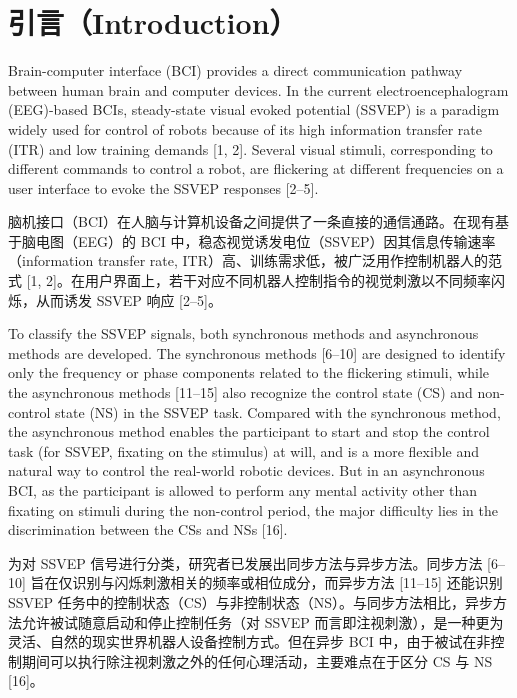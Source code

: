\documentclass[11pt]{ctexart}
\newenvironment{en}{\begin{enbox}\color{black!85}}{\end{enbox}}
\newenvironment{zh}{\begin{zhbox}}{\end{zhbox}}
\begin{document}
\section{引言（Introduction）}

\begin{en}
Brain-computer interface (BCI) provides a direct communication pathway between human brain and computer devices. In the current electroencephalogram (EEG)-based BCIs, steady-state visual evoked potential (SSVEP) is a paradigm widely used for control of robots because of its high information transfer rate (ITR) and low training demands [1, 2]. Several visual stimuli, corresponding to different commands to control a robot, are flickering at different frequencies on a user interface to evoke the SSVEP responses [2--5].
\end{en}
\begin{zh}
脑机接口（BCI）在人脑与计算机设备之间提供了一条直接的通信通路。在现有基于脑电图（EEG）的 BCI 中，稳态视觉诱发电位（SSVEP）因其信息传输速率（information transfer rate, ITR）高、训练需求低，被广泛用作控制机器人的范式 [1, 2]。在用户界面上，若干对应不同机器人控制指令的视觉刺激以不同频率闪烁，从而诱发 SSVEP 响应 [2--5]。
\end{zh}

\begin{en}
To classify the SSVEP signals, both synchronous methods and asynchronous methods are developed. The synchronous methods [6--10] are designed to identify only the frequency or phase components related to the flickering stimuli, while the asynchronous methods [11--15] also recognize the control state (CS) and non-control state (NS) in the SSVEP task. Compared with the synchronous method, the asynchronous method enables the participant to start and stop the control task (for SSVEP, fixating on the stimulus) at will, and is a more flexible and natural way to control the real-world robotic devices. But in an asynchronous BCI, as the participant is allowed to perform any mental activity other than fixating on stimuli during the non-control period, the major difficulty lies in the discrimination between the CSs and NSs [16].
\end{en}
\begin{zh}
为对 SSVEP 信号进行分类，研究者已发展出同步方法与异步方法。同步方法 [6--10] 旨在仅识别与闪烁刺激相关的频率或相位成分，而异步方法 [11--15] 还能识别 SSVEP 任务中的控制状态（CS）与非控制状态（NS）。与同步方法相比，异步方法允许被试随意启动和停止控制任务（对 SSVEP 而言即注视刺激），是一种更为灵活、自然的现实世界机器人设备控制方式。但在异步 BCI 中，由于被试在非控制期间可以执行除注视刺激之外的任何心理活动，主要难点在于区分 CS 与 NS [16]。
\end{zh}
\end{document}
